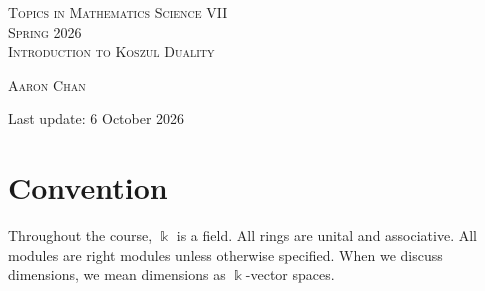 \documentclass[11pt,a4paper]{article}
\numberwithin{equation}{section}
\theoremstyle{all}
\theoremstyle{remark}
\newtheorem{remark}[theorem]{Remark}
\newcommand{\bbD}{\mathbb{D}}
\begin{document}
\begin{center}
\textsc{{\LARGE Topics in Mathematics Science VII}\\
Spring 2026}\\
\textsc{\Large Introduction to Koszul Duality}

\textsc{Aaron Chan}
\end{center}

Last update: 6 October 2026

\setcounter{tocdepth}{1}
\tableofcontents

\section*{Convention}

\label{not:base-field}
Throughout the course, $\Bbbk$ is a field.
All rings are unital and associative.
All modules are right modules unless otherwise specified.
When we discuss dimensions, we mean dimensions as $\Bbbk$-vector spaces.
\end{document}
